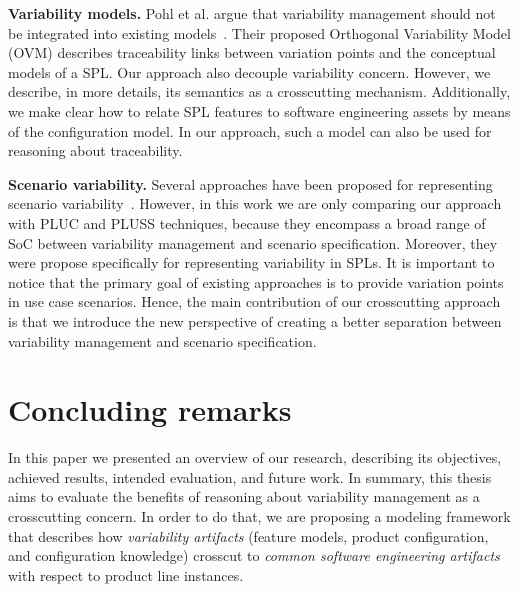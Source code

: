 \documentclass[times, 11pt,twocolumn]{article}
\begin{document}
{\bf Variability models.} Pohl et al. argue that variability management
should not be integrated into existing models~\cite{Pohl:2005aa}. Their
proposed Orthogonal Variability Model (OVM) describes traceability links between variation
points and the conceptual models of a SPL. Our approach also decouple
variability concern. However, we describe, in more details,
its semantics as a crosscutting mechanism. Additionally, we make
clear how to relate SPL features to software engineering assets by
means of the configuration model. In our approach, such a model
can also be used for reasoning about traceability.  

{\bf Scenario variability.} Several approaches have been proposed for
representing scenario variability~\cite{Jacobson:1997aa, Griss:1998aa,
Eriksson:2005aa,Bertolino:2003aa}. However, in this work we are only comparing
our approach with PLUC and PLUSS techniques, because they encompass a broad range
of SoC between variability management and scenario specification. Moreover, they
were propose specifically for representing variability in SPLs. It is important
to notice that the primary goal of existing approaches is to provide variation
points in use case scenarios. Hence, the main contribution of our crosscutting
approach is that we introduce the new perspective of creating a better separation
between variability management and scenario specification.
 

\section{Concluding remarks}\label{sec:concludings}

In this paper we presented an overview of our research, describing its
objectives, achieved results, intended evaluation, and future work. In
summary, this thesis aims to evaluate the benefits of reasoning
about variability management as a crosscutting concern. In order to do that, we
are proposing a modeling framework that describes how \emph{variability
artifacts} (feature models, product configuration, and configuration knowledge)
crosscut to \emph{common software engineering artifacts} with respect to
product line instances.




\end{document}
